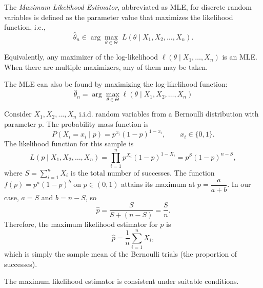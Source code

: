 \begin{definition}
The \emph{Maximum Likelihood Estimator}, abbreviated as MLE, for discrete random variables is defined as the parameter value that maximizes the likelihood function, i.e.,
\[
\hat{\theta}_n \in \arg \max_{\theta \in \Theta} \; L(\theta \mid X_1, X_2, \dots, X_n).
\]
\end{definition}

Equivalently, any maximizer of the log-likelihood \(\ell(\theta \mid X_1, \dots, X_n)\) is an MLE. When there are multiple maximizers, any of them may be taken.

The MLE can also be found by maximizing the log-likelihood function:
\[
\hat{\theta}_n = \arg \max_{\theta \in \Theta} \ell(\theta \mid X_1, X_2, \dots, X_n)
\]

\begin{example}
Consider \( X_1, X_2, \dots, X_n \) i.i.d. random variables from a Bernoulli distribution with parameter \( p \). The probability mass function is
\[
P(X_i = x_i \mid p) = p^{x_i}(1 - p)^{1 - x_i}, \qquad x_i \in \{0,1\}.
\]
The likelihood function for this sample is
\[
L(p \mid X_1, X_2, \dots, X_n) = \prod_{i=1}^{n} p^{X_i}(1 - p)^{1 - X_i}
= p^{S} (1 - p)^{n - S},
\]
where \( S = \sum_{i=1}^{n} X_i \) is the total number of successes. The function \( f(p) = p^{a}(1-p)^{b} \) on \(p \in (0,1)\) attains its maximum at \( p = \dfrac{a}{a+b} \). In our case, \( a = S \) and \( b = n-S \), so
\[
\hat{p} = \frac{S}{S + (n - S)} = \frac{S}{n}.
\]
Therefore, the maximum likelihood estimator for \( p \) is
\[
\hat{p} = \frac{1}{n} \sum_{i=1}^{n} X_i,
\]
which is simply the sample mean of the Bernoulli trials (the proportion of successes).
\end{example}

The maximum likelihood estimator is consistent under suitable conditions.

